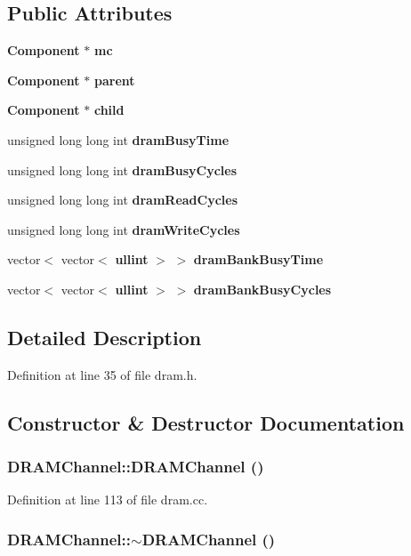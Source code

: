 \subsection*{Public Attributes}
\begin{CompactItemize}
\item 
{\bf Component} $\ast$ {\bf mc}
\item 
{\bf Component} $\ast$ {\bf parent}
\item 
{\bf Component} $\ast$ {\bf child}
\item 
unsigned long long int {\bf dramBusyTime}
\item 
unsigned long long int {\bf dramBusyCycles}
\item 
unsigned long long int {\bf dramReadCycles}
\item 
unsigned long long int {\bf dramWriteCycles}
\item 
vector$<$ vector$<$ {\bf ullint} $>$ $>$ {\bf dramBankBusyTime}
\item 
vector$<$ vector$<$ {\bf ullint} $>$ $>$ {\bf dramBankBusyCycles}
\end{CompactItemize}


\subsection{Detailed Description}


Definition at line 35 of file dram.h.

\subsection{Constructor \& Destructor Documentation}
\subsubsection[{DRAMChannel}]{\setlength{\rightskip}{0pt plus 5cm}DRAMChannel::DRAMChannel ()}\label{classDRAMChannel_e4998aa7924b6f6a46966f62eed46f93}




Definition at line 113 of file dram.cc.
\subsubsection[{$\sim$DRAMChannel}]{\setlength{\rightskip}{0pt plus 5cm}DRAMChannel::$\sim$DRAMChannel ()}\label{classDRAMChannel_bc6c60b5fb226ee24a986ddd5b1f1b80}




